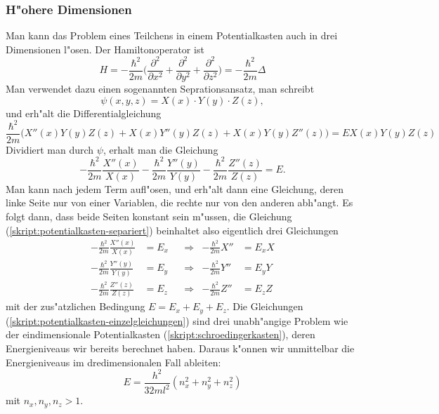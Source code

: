 \subsubsection{H"ohere Dimensionen}
Man kann das Problem eines Teilchens in einem Potentialkasten auch
in drei Dimensionen l"osen.
Der Hamiltonoperator ist 
\[
H=-\frac{\hbar^2}{2m}\biggl(
\frac{\partial^2}{\partial x^2}
+
\frac{\partial^2}{\partial y^2}
+
\frac{\partial^2}{\partial z^2}
\biggr)
=-\frac{\hbar^2}{2m}\Delta
\]
Man verwendet dazu einen sogenannten Seprationsansatz, man schreibt
\[
\psi(x,y,z)=X(x)\cdot Y(y)\cdot Z(z),
\]
und erh"alt die Differentialgleichung
\[
\frac{\hbar^2}{2m}\biggl(
X''(x)Y(y)Z(z)
+
X(x)Y''(y)Z(z)
+
X(x)Y(y)Z''(z)
\biggr)
=
EX(x)Y(y)Z(z)
\]
Dividiert man durch $\psi$, erhalt man die Gleichung
\begin{equation}
-\frac{\hbar^2}{2m}\frac{X''(x)}{X(x)}
-
\frac{\hbar^2}{2m}\frac{Y''(y)}{Y(y)}
-
\frac{\hbar^2}{2m}\frac{Z''(z)}{Z(z)}
=
E.
\label{skript:potentialkasten-separiert}
\end{equation}
Man kann nach jedem Term aufl"osen, und erh"alt dann eine Gleichung,
deren linke Seite nur von einer Variablen, die rechte nur von den anderen
abh"angt.
Es folgt dann, dass beide Seiten konstant sein m"ussen, 
die Gleichung (\ref{skript:potentialkasten-separiert}) beinhaltet also eigentlich
drei Gleichungen
\begin{equation}
\begin{aligned}
-\frac{\hbar^2}{2m}\frac{X''(x)}{X(x)}&=E_x&&\Rightarrow&-\frac{\hbar^2}{2m}X''&=E_xX\\
-\frac{\hbar^2}{2m}\frac{Y''(y)}{Y(y)}&=E_y&&\Rightarrow&-\frac{\hbar^2}{2m}Y''&=E_yY\\
-\frac{\hbar^2}{2m}\frac{Z''(z)}{Z(z)}&=E_z&&\Rightarrow&-\frac{\hbar^2}{2m}Z''&=E_zZ
\end{aligned}
\label{skript:potentialkasten-einzelgleichungen}
\end{equation}
mit der zus"atzlichen Bedingung $E=E_x+E_y+E_z$.
Die Gleichungen (\ref{skript:potentialkasten-einzelgleichungen}) sind drei
unabh"angige Problem wie der eindimensionale Potentialkasten
(\ref{skript:schroedingerkasten}), deren Energieniveaus wir bereits berechnet
haben.
Daraus k"onnen wir unmittelbar die Energieniveaus im dredimensionalen
Fall ableiten:
\begin{equation}
E=\frac{h^2}{32ml^2}(n_x^2+n_y^2+n_z^2)
\label{skript:3dzustaende}
\end{equation}
mit $n_x,n_y,n_z>1$.

